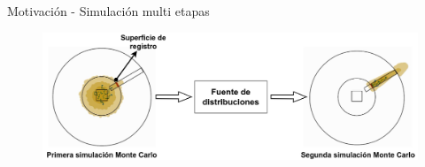 \documentclass[aspectratio=169,english]{beamer}
\begin{document}
\begin{frame}{Motivación - Simulación multi etapas}
    \begin{figure}
        \centering
        \includegraphics[width=1\linewidth]{imagens/nucleo4.png}
    \end{figure}
\end{frame}




\end{document}
